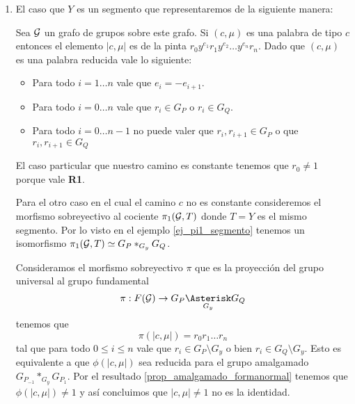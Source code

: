 \documentclass[tesis.tex]{subfiles}
\begin{document}
\begin{enumerate}
			\item El caso que $Y$ es un segmento que representaremos de la siguiente manera:
			
			\begin{center}
			\end{center}
			Sea ${\cal G}$ un grafo de grupos sobre este grafo.		
			Si $(c, \mu)$ es una palabra de tipo $c$ entonces el elemento $|c, \mu|$ es de la pinta $r_0y^{e_1}r_1y^{e_2}\dots y^{e_n}r_n$.
			Dado que $(c, \mu)$ es una palabra reducida vale lo siguiente:
			\begin{itemize}
				\item Para todo $i=1 \dots n$ vale que $e_{i} = -e_{i+1}$.
				\item Para todo $i=0 \dots n$ vale que $r_{i} \in G_{P}$ o $r_i \in G_Q$.
				\item Para todo $i=0 \dots n-1$ no puede valer que $r_i,r_{i+1} \in G_P$ o que $r_i,r_{i+1} \in G_Q$
			\end{itemize}
			El caso particular que nuestro camino es constante tenemos que $r_0 \neq 1$ porque vale \textbf{R1}.
			
			Para el otro caso en el cual  el camino $c$ no es constante consideremos el morfismo sobreyectivo al cociente $\pi_1({\cal G},T)$ donde $T=Y$ es el mismo segmento.
			Por lo visto en el ejemplo \ref{ej_pi1_segmento} tenemos un isomorfismo $\pi_1({\cal G}, T) \simeq G_{P} \ast_{G_y} G_{Q}$. 
			
			Consideramos el morfismo sobreyectivo $\pi$ que es la proyección del grupo universal al grupo fundamental
			\[
			\pi: F(\cG) \to G_{P} \underset{G_y}{\Asterisk} G_{Q}
			\]
			tenemos que
			\[
				\pi(|c, \mu|) = r_0r_1 \dots r_n
			\]
			tal que para todo $0 \le i \le n$ vale que 
			$r_i \in G_{P} \setminus G_{y}$ o bien $r_{i} \in G_{Q} \setminus G_{y}$.
			Esto es equivalente a que $\phi(|c, \mu|)$ sea reducida para el grupo amalgamado $G_{P_{-1}} \ast_{G_y} G_{P_1}$. 
			Por el resultado \ref{prop_amalgamado_formanormal} tenemos que $\phi(|c,\mu|) \neq 1$ y así concluimos que $|c, \mu| \neq 1$ no es la identidad.



\end{enumerate}
\end{document}
